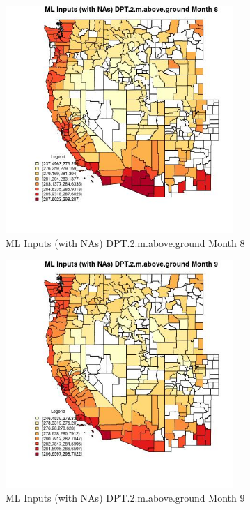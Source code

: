 \begin{figure} 
\centering  
\includegraphics[width=0.77\textwidth]{Code_Outputs/Report_ML_input_PM25_Step4_part_f_de_duplicated_aveswNAs_CountyDPT2mabovegroundmedianMonth8.jpg} 
\caption{\label{fig:Report_ML_input_PM25_Step4_part_f_de_duplicated_aveswNAsCountyDPT2mabovegroundmedianMonth8}ML Inputs (with NAs) DPT.2.m.above.ground Month 8} 
\end{figure} 
 

\begin{figure} 
\centering  
\includegraphics[width=0.77\textwidth]{Code_Outputs/Report_ML_input_PM25_Step4_part_f_de_duplicated_aveswNAs_CountyDPT2mabovegroundmedianMonth9.jpg} 
\caption{\label{fig:Report_ML_input_PM25_Step4_part_f_de_duplicated_aveswNAsCountyDPT2mabovegroundmedianMonth9}ML Inputs (with NAs) DPT.2.m.above.ground Month 9} 
\end{figure} 
 

